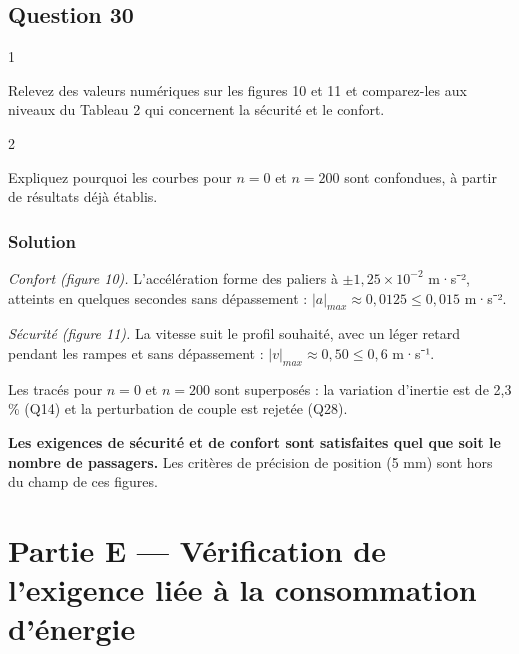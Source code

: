\documentclass[11pt,a4paper]{article}
\begin{document}
\hypertarget{question-30}{%
\subsection{Question 30}\label{question-30}}

\begin{indication}{1}

Relevez des valeurs numériques sur les figures 10 et 11 et comparez-les aux niveaux du Tableau 2 qui concernent la sécurité et le confort.

\end{indication}

\begin{indication}{2}

Expliquez pourquoi les courbes pour \(n=0\) et \(n=200\) sont confondues, à partir de résultats déjà établis.

\end{indication}

\hypertarget{solution-29}{%
\subsubsection{Solution}\label{solution-29}}

\emph{Confort (figure 10).} L'accélération forme des paliers à \(\pm1{,}25\times10^{-2}\) m·s⁻², atteints en quelques secondes sans dépassement : \(|a|_{max}\approx0{,}0125\leqslant0{,}015\) m·s⁻².

\emph{Sécurité (figure 11).} La vitesse suit le profil souhaité, avec un léger retard pendant les rampes et sans dépassement : \(|v|_{max}\approx0{,}50\leqslant0{,}6\) m·s⁻¹.

Les tracés pour \(n=0\) et \(n=200\) sont superposés : la variation d'inertie est de 2,3 \% (Q14) et la perturbation de couple est rejetée (Q28).

\textbf{Les exigences de sécurité et de confort sont satisfaites quel que soit le nombre de passagers.} Les critères de précision de position (5 mm) sont hors du champ de ces figures.

\hypertarget{partie-e-vuxe9rification-de-lexigence-liuxe9e-uxe0-la-consommation-duxe9nergie}{%
\section{Partie E --- Vérification de l'exigence liée à la consommation d'énergie}\label{partie-e-vuxe9rification-de-lexigence-liuxe9e-uxe0-la-consommation-duxe9nergie}}
\end{document}
